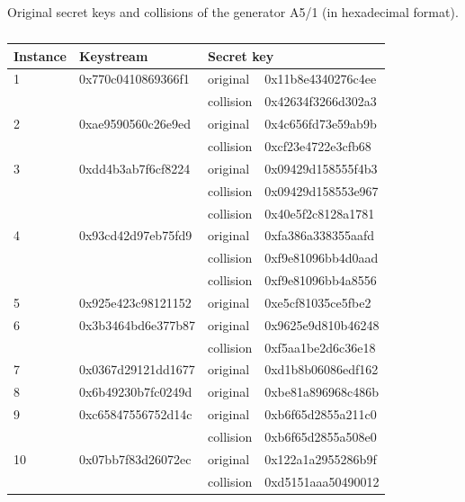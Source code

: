 \documentclass[runningheads,a4paper]{llncs}[2015/06/24]
\begin{document}
\begin{table} 
\caption{} 
\label{tab:keys} Original secret keys and collisions of the
	generator A5/1 (in hexadecimal format).
	\begin {center} 
		\begin{tabular}
			{| l | l | l | l |}
			\hline
			Instance & Keystream & \multicolumn{2}{|l|}{Secret key} \\ 
			\hline
			\hline
			1 & 0x770c0410869366f1 & original & 0x11b8e4340276c4ee \\
			  &                    & collision & 0x42634f3266d302a3 \\ 
			\hline
			2 & 0xae9590560c26e9ed & original & 0x4c656fd73e59ab9b \\
			  &                    & collision & 0xcf23e4722e3cfb68 \\ 
			\hline
			3 & 0xdd4b3ab7f6cf8224 & original & 0x09429d158555f4b3 \\
			  &                    & collision & 0x09429d158553e967 \\
			  &                    & collision & 0x40e5f2c8128a1781 \\ 
			\hline
			4 & 0x93cd42d97eb75fd9 & original & 0xfa386a338355aafd \\
			  &                    & collision & 0xf9e81096bb4d0aad \\ 
			  &                    & collision & 0xf9e81096bb4a8556 \\ 
			\hline
			5 & 0x925e423c98121152 & original & 0xe5cf81035ce5fbe2 \\ 
			\hline
			6 & 0x3b3464bd6e377b87 & original & 0x9625e9d810b46248 \\
			  &                    & collision & 0xf5aa1be2d6c36e18 \\ 
			  \hline
			7 & 0x0367d29121dd1677 & original & 0xd1b8b06086edf162 \\ 
			\hline
			8 & 0x6b49230b7fc0249d & original & 0xbe81a896968c486b \\ 
			\hline
			9 & 0xc65847556752d14c & original & 0xb6f65d2855a211c0 \\ 
			  &                    & collision & 0xb6f65d2855a508e0 \\ 
			\hline
			10& 0x07bb7f83d26072ec & original & 0x122a1a2955286b9f \\ 
			  &                    & collision & 0xd5151aaa50490012 \\ 
			\hline
		\end{tabular}
	\end {center}
\end{table}
\end{document}
